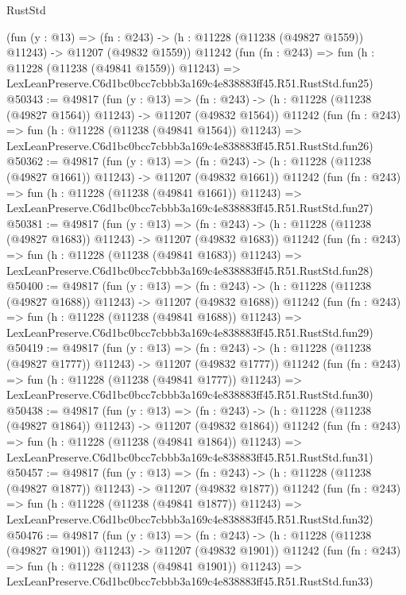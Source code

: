 \begin{lexlean}{RustStd}
\begin{coremodule}
    (fun (y : @13) =>
    (fn : @243) -> (h : @11228 (@11238 (@49827 @1559)) @11243) -> @11207 (@49832 @1559))
    @11242
    (fun (fn : @243) =>
    fun (h : @11228 (@11238 (@49841 @1559)) @11243) =>
    LexLeanPreserve.C6d1bc0bcc7cbbb3a169c4e838883ff45.R51.RustStd.fun25)
@50343 := @49817
    (fun (y : @13) =>
    (fn : @243) -> (h : @11228 (@11238 (@49827 @1564)) @11243) -> @11207 (@49832 @1564))
    @11242
    (fun (fn : @243) =>
    fun (h : @11228 (@11238 (@49841 @1564)) @11243) =>
    LexLeanPreserve.C6d1bc0bcc7cbbb3a169c4e838883ff45.R51.RustStd.fun26)
@50362 := @49817
    (fun (y : @13) =>
    (fn : @243) -> (h : @11228 (@11238 (@49827 @1661)) @11243) -> @11207 (@49832 @1661))
    @11242
    (fun (fn : @243) =>
    fun (h : @11228 (@11238 (@49841 @1661)) @11243) =>
    LexLeanPreserve.C6d1bc0bcc7cbbb3a169c4e838883ff45.R51.RustStd.fun27)
@50381 := @49817
    (fun (y : @13) =>
    (fn : @243) -> (h : @11228 (@11238 (@49827 @1683)) @11243) -> @11207 (@49832 @1683))
    @11242
    (fun (fn : @243) =>
    fun (h : @11228 (@11238 (@49841 @1683)) @11243) =>
    LexLeanPreserve.C6d1bc0bcc7cbbb3a169c4e838883ff45.R51.RustStd.fun28)
@50400 := @49817
    (fun (y : @13) =>
    (fn : @243) -> (h : @11228 (@11238 (@49827 @1688)) @11243) -> @11207 (@49832 @1688))
    @11242
    (fun (fn : @243) =>
    fun (h : @11228 (@11238 (@49841 @1688)) @11243) =>
    LexLeanPreserve.C6d1bc0bcc7cbbb3a169c4e838883ff45.R51.RustStd.fun29)
@50419 := @49817
    (fun (y : @13) =>
    (fn : @243) -> (h : @11228 (@11238 (@49827 @1777)) @11243) -> @11207 (@49832 @1777))
    @11242
    (fun (fn : @243) =>
    fun (h : @11228 (@11238 (@49841 @1777)) @11243) =>
    LexLeanPreserve.C6d1bc0bcc7cbbb3a169c4e838883ff45.R51.RustStd.fun30)
@50438 := @49817
    (fun (y : @13) =>
    (fn : @243) -> (h : @11228 (@11238 (@49827 @1864)) @11243) -> @11207 (@49832 @1864))
    @11242
    (fun (fn : @243) =>
    fun (h : @11228 (@11238 (@49841 @1864)) @11243) =>
    LexLeanPreserve.C6d1bc0bcc7cbbb3a169c4e838883ff45.R51.RustStd.fun31)
@50457 := @49817
    (fun (y : @13) =>
    (fn : @243) -> (h : @11228 (@11238 (@49827 @1877)) @11243) -> @11207 (@49832 @1877))
    @11242
    (fun (fn : @243) =>
    fun (h : @11228 (@11238 (@49841 @1877)) @11243) =>
    LexLeanPreserve.C6d1bc0bcc7cbbb3a169c4e838883ff45.R51.RustStd.fun32)
@50476 := @49817
    (fun (y : @13) =>
    (fn : @243) -> (h : @11228 (@11238 (@49827 @1901)) @11243) -> @11207 (@49832 @1901))
    @11242
    (fun (fn : @243) =>
    fun (h : @11228 (@11238 (@49841 @1901)) @11243) =>
    LexLeanPreserve.C6d1bc0bcc7cbbb3a169c4e838883ff45.R51.RustStd.fun33)

\end{coremodule}
\end{lexlean}
